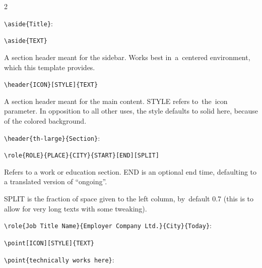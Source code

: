 \begin{paracol}{2}
    \switchcolumn*

    \begin{center}
      \color{page}

      \begingroup\color{lightgray}\verb!\aside{Title}!:\endgroup

    \end{center}

    \switchcolumn

    \verb!\aside{TEXT}!

    A section header meant for the sidebar.
    Works best in~a~centered environment, which this template provides.

    \vspace{4mm}

    \verb!\header{ICON}[STYLE]{TEXT}!

    A section header meant for the main content.
    STYLE refers to~the~icon parameter.
    In opposition to all other uses, the style defaults to solid here, because of the colored background.

    \begingroup\color{gray}\verb!\header{th-large}{Section}!:\endgroup

    \vspace{4mm}

    \verb!\role{ROLE}{PLACE}{CITY}{START}[END][SPLIT]!

    Refers to a work or education section.
    END is an optional end time, defaulting to a translated version of ``ongoing''.

    SPLIT is the fraction of space given to the left column, by~default 0.7 (this is to allow for very long texts with some tweaking).

    \begingroup\color{gray}\verb!\role{Job Title Name}{Employer Company Ltd.}{City}{Today}!:\endgroup

    \vspace{4mm}

    \verb!\point[ICON][STYLE]{TEXT}!

    \switchcolumn*

    \begin{center}
      \color{page}

      \begingroup\color{lightgray}\verb!\point{technically works here}!:\endgroup

    \end{center}

    \switchcolumn


\end{paracol}
